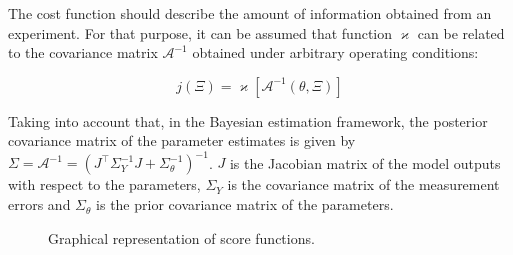 \documentclass[a4paper,fleqn]{cas-dc}
\begin{document}
		The cost function should describe the amount of information obtained from an experiment. For that purpose, it can be assumed that function $\varkappa$ can be related to the covariance matrix $\mathcal{A}^{-1}$ obtained under arbitrary operating conditions:
		
		{\footnotesize \begin{equation} j(\Xi) = \varkappa\left[ \mathcal{A}^{-1}(\theta, \Xi) \right] \end{equation} }
		
		Taking into account that, in the Bayesian estimation framework, the posterior covariance matrix of the parameter estimates is given by $\Sigma = \mathcal{A}^{-1} = \left(J^\top \Sigma_Y^{-1} J + \Sigma_\theta^{-1}\right)^{-1} $. $J$ is the Jacobian matrix of the model outputs with respect to the parameters, $\Sigma_Y$ is the covariance matrix of the measurement errors and $\Sigma_\theta$ is the prior covariance matrix of the parameters.
		
		\begin{figure}[!h]
			\centering
			\caption{Graphical representation of score functions.}
			\label{fig:score_fun}
		\end{figure}
		
\end{document}
